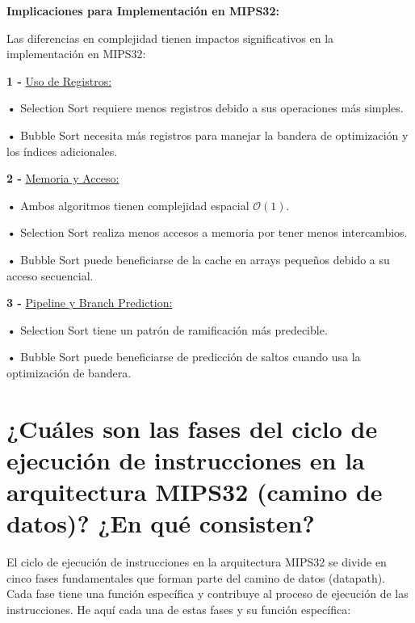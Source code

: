 \documentclass{article}
\begin{document}
\textbf{Implicaciones para Implementación en MIPS32: }

\quad

{Las diferencias en complejidad tienen impactos significativos en la implementación en MIPS32:}

\quad

\textbf{1 -  } {\underline{Uso de Registros: }}

\quad

\textbf{    •} { Selection Sort requiere menos registros debido a sus operaciones más simples.}


\textbf{    •} { Bubble Sort necesita más registros para manejar la bandera de optimización y los índices adicionales.}

\quad

\textbf{2 -  } {\underline{Memoria y Acceso: }}

\quad

\textbf{    •} { Ambos algoritmos tienen complejidad espacial $\mathcal{O}(1)$.}


\textbf{    •} { Selection Sort realiza menos accesos a memoria por tener menos intercambios.}


\textbf{    •} { Bubble Sort puede beneficiarse de la cache en arrays pequeños debido a su acceso secuencial.}

\quad

\textbf{3 -  } {\underline{Pipeline y Branch Prediction: }}

\quad

\textbf{    •} { Selection Sort tiene un patrón de ramificación más predecible.}


\textbf{    •} { Bubble Sort puede beneficiarse de predicción de saltos cuando usa la optimización de bandera.}

\quad
\newpage









\section{¿Cuáles son las fases del ciclo de ejecución de instrucciones en la arquitectura MIPS32 (camino de datos)? ¿En qué consisten?}

\quad

{ El ciclo de ejecución de instrucciones en la arquitectura MIPS32 se divide en cinco fases fundamentales que forman parte del camino de datos (datapath). Cada fase tiene una función específica y contribuye al proceso de ejecución de las instrucciones. He aquí cada una de estas fases y su función específica: }
\end{document}
